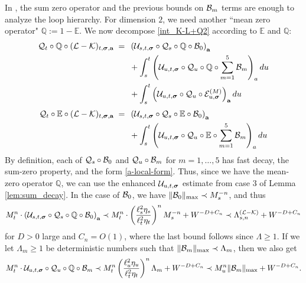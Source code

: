 In \cite{YY_25}, the sum zero operator and the previous bounds on ${\cal B}_{m}$ terms are enough to analyze the loop hierarchy. For dimension $2$, we need another ``mean zero operator" $\mathbb Q:=1-\mathbb E$. We now decompose \eqref{int_K-L+Q2} according to $\mathbb E$ and $\mathbb Q$:
\begin{align}\label{int_K-L+QQ}
  {\cal Q}_t\circ \mathbb Q\circ  (\mathcal{L} - \mathcal{K})_{t, \boldsymbol{\sigma}, \textbf{a}} \;=\; \; &
    \left(\mathcal{U}_{s, t, \boldsymbol{\sigma}} \circ  {\cal Q}_s\circ \mathbb Q\circ  {\cal B}_0\right)_{\textbf{a}} \\\nonumber
    &+   \int_{s}^t \left(\mathcal{U}_{u, t, \boldsymbol{\sigma}} \circ  {\cal Q}_u\circ \mathbb Q\circ  \sum_{m=1}^5{\cal B}_m  \right)_a du
   \\\nonumber
    &+  \int_{s}^t \left(\mathcal{U}_{u, t, \boldsymbol{\sigma}} \circ  {\cal Q}_u\circ \mathcal{E}^{(M)}_{u, \boldsymbol{\sigma}}\right)_{\textbf{a}} du
\end{align}
\begin{align}\label{int_K-L+QE}
  {\cal Q}_t\circ \mathbb E\circ  (\mathcal{L} - \mathcal{K})_{t, \boldsymbol{\sigma}, \textbf{a}} \;=\; \; &
    \left(\mathcal{U}_{s, t, \boldsymbol{\sigma}} \circ  {\cal Q}_s\circ \mathbb E\circ  {\cal B}_0\right)_{\textbf{a}} \\\nonumber
    &+   \int_{s}^t \left(\mathcal{U}_{u, t, \boldsymbol{\sigma}} \circ  {\cal Q}_u\circ \mathbb E\circ  \sum_{m=1}^5{\cal B}_m  \right)_a du
\end{align}
By definition, each of ${\cal Q}_{s}\circ {\cal B}_{0}$ and ${\cal Q}_{u}\circ {\cal B}_{m}$ for $m=1,\ldots,5$ has fast decay, the sum-zero property, and the form \eqref{a-local-form}. Thus, since we have the mean-zero operator $\mathbb{Q}$, we can use the enhanced ${\cal U}_{u,t,\boldsymbol{\sigma}}$ estimate from case 3 of Lemma \ref{lem:sum_decay}. In the case of ${\cal B}_{0}$, we have $\|{\cal B}_{0}\|_{\max}\prec M_{s}^{-n}$, and thus
$$
M_{t}^{n}\cdot  \left(\mathcal{U}_{s, t, \boldsymbol{\sigma}} \circ  {\cal Q}_s\circ \mathbb Q\circ  {\cal B}_0\right)_{\textbf{a}}\prec M_{t}^{n}\cdot\left(\frac{\ell_{s}^{2}\eta_{s}}{\ell_{t}^{2}\eta_{t}}\right)^{n}M_{s}^{-n}+W^{-D+C_{n}}\prec \Lambda^{(\cal L-\cal K)}_{s,n}+W^{-D+C_{n}}
 $$
for $D>0$ large and $C_{n}=O(1)$, where the last bound follows since $\Lambda\geq1$. If we let $\Lambda_{m}\geq1$ be deterministic numbers such that $\|{\cal B}_{m}\|_{\max}\prec \Lambda_{m}$, then we also get
 $$ M_{t}^{n}\cdot \mathcal{U}_{u, t, \boldsymbol{\sigma}} \circ  {\cal Q}_u\circ \mathbb Q\circ   {\cal B}_m  \prec M_{t}^{n}\left(\frac{\ell_{u}^{2}\eta_{u}}{\ell_{t}^{2}\eta_{t}}\right)^n \Lambda_{m}+W^{-D+C_{n}}\prec M_{u}^{n}\|{\cal B}_{m}\|_{\max}+W^{-D+C_{n}}.
$$
